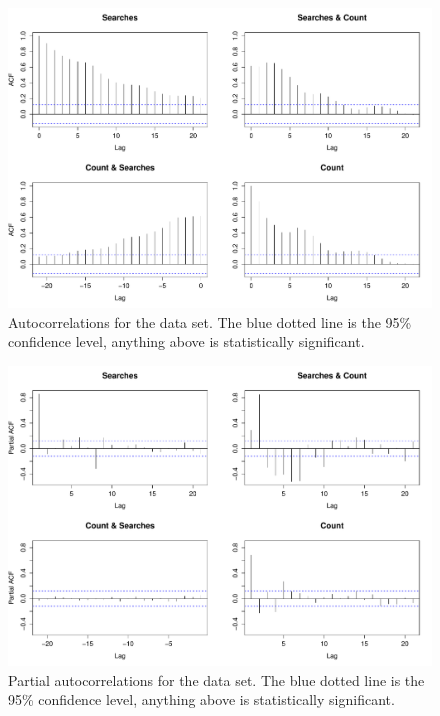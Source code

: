\documentclass[minf,twoside,singlespacing,parskip,notimes,deptreport]{infthesis} %
\begin{document}
\begin{figure}[]
\begin{center}
\includegraphics[width=\textwidth]{autocorrelation}
\end{center}
\caption{Autocorrelations for the data set. The blue dotted line is the 95\% confidence level, anything above is statistically significant.}
\label{autocor}
\end{figure}

\begin{figure}[]
\begin{center}
\includegraphics[width=\textwidth]{partial_autocorellation}
\end{center}
\caption{Partial autocorrelations for the data set. The blue dotted line is the 95\% confidence level, anything above is statistically significant.}
\label{megacor}
\end{figure}
\end{document}
